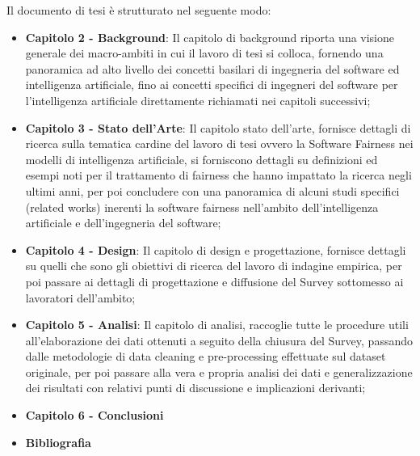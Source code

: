 Il documento di tesi è strutturato nel seguente modo:

\begin{itemize}
    \item \textbf{Capitolo 2 - Background}: Il capitolo di background riporta una visione generale dei macro-ambiti in cui il lavoro di tesi si colloca, fornendo una panoramica ad alto livello dei concetti basilari di ingegneria del software ed intelligenza artificiale, fino ai concetti specifici di ingegneri del software per l'intelligenza artificiale direttamente richiamati nei capitoli successivi;
    \item \textbf{Capitolo 3 - Stato dell'Arte}: Il capitolo stato dell'arte, fornisce dettagli di ricerca sulla tematica cardine del lavoro di tesi ovvero la Software Fairness nei modelli di intelligenza artificiale, si forniscono dettagli su definizioni ed esempi noti per il trattamento di fairness che hanno impattato la ricerca negli ultimi anni, per poi concludere con una panoramica di alcuni studi specifici (related works) inerenti la software fairness nell'ambito dell'intelligenza artificiale e dell'ingegneria del software;
    \item \textbf{Capitolo 4 - Design}: Il capitolo di design e progettazione, fornisce dettagli su quelli che sono gli obiettivi di ricerca del lavoro di indagine empirica, per poi passare ai dettagli di progettazione e diffusione del Survey sottomesso ai lavoratori dell'ambito;
    \item \textbf{Capitolo 5 - Analisi}: Il capitolo di analisi, raccoglie tutte le procedure utili all'elaborazione dei dati ottenuti a seguito della chiusura del Survey, passando dalle metodologie di data cleaning e pre-processing effettuate sul dataset originale, per poi passare alla vera e propria analisi dei dati e generalizzazione dei risultati con relativi punti di discussione e implicazioni derivanti;
   
    \item \textbf{Capitolo 6 - Conclusioni}
    
     \item \textbf{Bibliografia}
\end{itemize}

